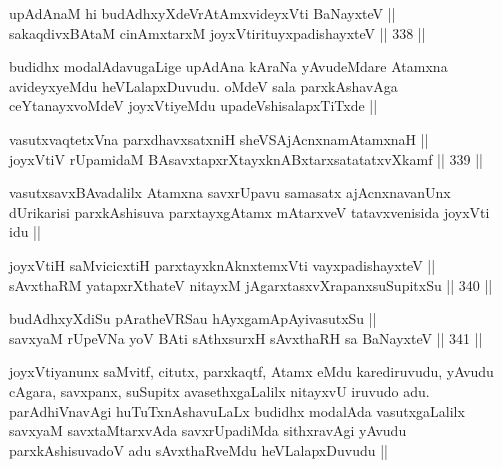 
\begin{shl}
upAdAnaM hi budAdhxyXdeVrAtAmxvideyxVti BaNayxteV || \\
sakaqdivxBAtaM cinAmxtarxM joyxVtirituyxpadishayxteV ||  338 ||  
\end{shl}

\begin{artha}
budidhx modalAdavugaLige upAdAna kAraNa yAvudeMdare Atamxna avideyxyeMdu heVLalapxDuvudu. oMdeV sala parxkAshavAga ceYtanayxvoMdeV joyxVtiyeMdu upadeVshisalapxTiTxde ||
\end{artha}


\begin{shl}
vasutxvaqtetxVna parxdhavxsatxniH sheVSAjAcnxnamAtamxnaH || \\
joyxVtiV rUpamidaM BAsavxtapxrXtayxknABxtarxsatatatxvXkamf ||  339 ||  
\end{shl}

\begin{artha}
vasutxsavxBAvadalilx Atamxna savxrUpavu samasatx ajAcnxnavanUnx dUrikarisi parxkAshisuva parxtayxgAtamx mAtarxveV tatavxvenisida joyxVti idu ||
\end{artha}


\begin{shl}
joyxVtiH saMvicicxtiH parxtayxknAknxtemxVti vayxpadishayxteV || \\
sAvxthaRM yatapxrXthateV nitayxM jAgarxtasxvXrapanxsuSupitxSu ||  340 || 
\end{shl}
				
\begin{shl}
budAdhxyXdiSu pAratheVRSau hAyxgamApAyivasutxSu || \\
savxyaM rUpeVNa yoV BAti sAthxsurxH sAvxthaRH sa BaNayxteV ||  341 ||  
\end{shl}

\begin{artha}
joyxVtiyanunx saMvitf, citutx, parxkaqtf, Atamx eMdu karediruvudu, yAvudu cAgara, savxpanx, suSupitx avasethxgaLalilx nitayxvU iruvudo adu. parAdhiVnavAgi huTuTxnAshavuLaLx budidhx modalAda vasutxgaLalilx savxyaM savxtaMtarxvAda savxrUpadiMda sithxravAgi yAvudu parxkAshisuvadoV adu sAvxthaRveMdu heVLalapxDuvudu ||
\end{artha}

